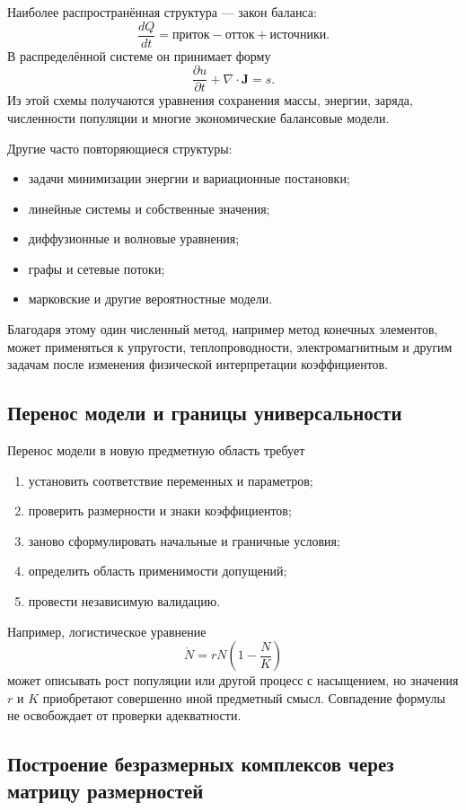 Наиболее распространённая структура --- закон баланса:
\[
\boxed{
\frac{dQ}{dt}
=\text{приток}-\text{отток}+\text{источники}.
}
\]
В распределённой системе он принимает форму
\[
\frac{\partial u}{\partial t}
+\nabla\cdot\mathbf J=s.
\]
Из этой схемы получаются уравнения сохранения массы, энергии, заряда,
численности популяции и многие экономические балансовые модели.

Другие часто повторяющиеся структуры:
\begin{itemize}
    \item задачи минимизации энергии и вариационные постановки;
    \item линейные системы и собственные значения;
    \item диффузионные и волновые уравнения;
    \item графы и сетевые потоки;
    \item марковские и другие вероятностные модели.
\end{itemize}
Благодаря этому один численный метод, например метод конечных элементов,
может применяться к упругости, теплопроводности, электромагнитным и другим
задачам после изменения физической интерпретации коэффициентов.

\subsection{Перенос модели и границы универсальности}

Перенос модели в новую предметную область требует
\begin{enumerate}
    \item установить соответствие переменных и параметров;
    \item проверить размерности и знаки коэффициентов;
    \item заново сформулировать начальные и граничные условия;
    \item определить область применимости допущений;
    \item провести независимую валидацию.
\end{enumerate}

Например, логистическое уравнение
\[
\dot N=rN\left(1-\frac NK\right)
\]
может описывать рост популяции или другой процесс с насыщением, но значения
$r$ и $K$ приобретают совершенно иной предметный смысл. Совпадение формулы
не освобождает от проверки адекватности.


\subsection{Построение безразмерных комплексов через матрицу размерностей}

